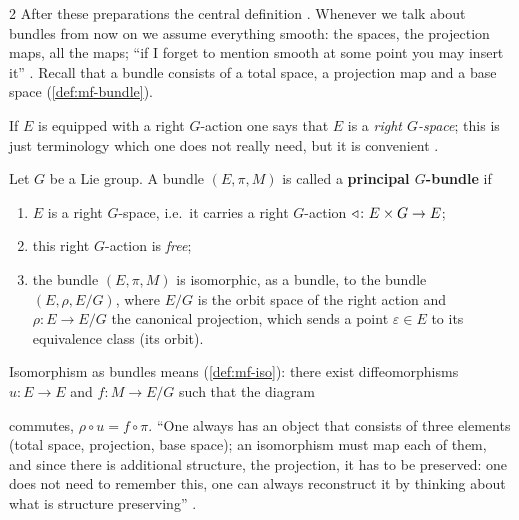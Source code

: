 \begin{paracol}{2}
After these preparations the central definition . Whenever we talk about bundles from now on we assume everything smooth: the spaces, the projection maps, all the maps; ``if I forget to mention smooth at some point you may insert it'' . Recall that a bundle consists of a total space, a projection map and a base space (\cref{def:mf-bundle}).

If $E$ is equipped with a right $G$-action one says that $E$ is a \emph{right $G$-space}; this is just terminology which one does not really need, but it is convenient  .
\begin{definition}\label{def:pb-principal}
Let $G$ be a Lie group. A bundle $(E,\pi,M)$ is called a \textbf{principal $G$-bundle} if
\begin{enumerate}
  \item[(i)] $E$ is a right $G$-space, i.e.\ it carries a right $G$-action $\mathbin{\triangleleft}\colon E\times G\to E$;
  \item[(ii)] this right $G$-action is \emph{free};
  \item[(iii)] the bundle $(E,\pi,M)$ is isomorphic, as a bundle, to the bundle $(E,\rho,E/G)$, where $E/G$ is the orbit space of the right action and $\rho\colon E\to E/G$ the canonical projection, which sends a point $\varepsilon\in E$ to its equivalence class (its orbit).
\end{enumerate}
        
\end{definition}
Isomorphism as bundles means (\cref{def:mf-iso}): there exist diffeomorphisms $u\colon E\to E$ and $f\colon M\to E/G$ such that the diagram
\begin{center}
\end{center}
commutes, $\rho\circ u=f\circ\pi$. ``One always has an object that consists of three elements (total space, projection, base space); an isomorphism must map each of them, and since there is additional structure, the projection, it has to be preserved: one does not need to remember this, one can always reconstruct it by thinking about what is structure preserving''        .


\end{paracol}
